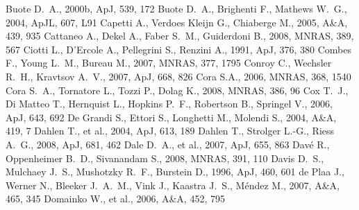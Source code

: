 \documentclass[useAMS,usenatbib]{mn2e}
\begin{document}
\begin{thebibliography}{}
   Buote D.~A., 2000b, ApJ, 539, 172 
   Buote D.~A., Brighenti F., Mathews W.~G., 2004, ApJL, 607, L91
   Capetti A., Verdoes Kleijn G., Chiaberge M., 2005, A\&A, 439, 935 
   Cattaneo A., Dekel A., Faber S.~M., Guiderdoni B., 2008, MNRAS, 389, 567
   Ciotti L., D'Ercole A., Pellegrini S., Renzini A., 1991, ApJ, 376, 380
   Combes F., Young L.~M., Bureau M., 2007, MNRAS, 377, 1795 
   Conroy C., Wechsler R.~H., Kravtsov A.~V., 2007, ApJ, 668, 826 
   Cora S.A., 2006, MNRAS, 368, 1540 
   Cora S.~A., Tornatore L., Tozzi P., Dolag K., 2008, MNRAS, 386, 96 
   Cox T.~J., Di Matteo T., Hernquist L., Hopkins P.~F., Robertson B., 
   Springel V., 2006, ApJ, 643, 692 
   De Grandi S., Ettori S., Longhetti M., Molendi S., 2004, A\&A, 419, 7
   Dahlen T., et al., 2004, ApJ, 613, 189 
   Dahlen T., Strolger L.-G., Riess A.~G., 2008, ApJ, 681, 462 
   Dale D.~A., et al., 2007, ApJ, 655, 863 
   Dav{\'e} R., Oppenheimer B.~D., Sivanandam S., 2008, MNRAS, 391, 110
   Davis D.~S., Mulchaey J.~S., Mushotzky R.~F., Burstein D., 1996, ApJ, 460, 
   601 
   de Plaa J., Werner N., Bleeker J.~A.~M., Vink J., Kaastra J.~S., 
   M{\'e}ndez M., 2007, A\&A, 465, 345 
   Domainko W., et al., 2006, A\&A, 452, 795

\end{thebibliography}
\end{document}
